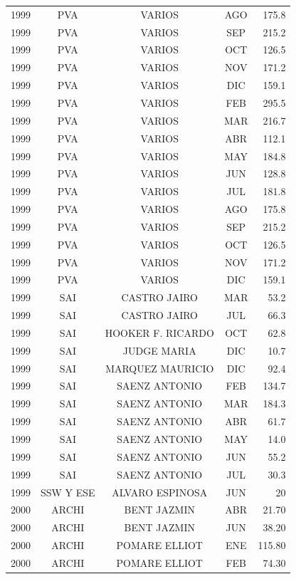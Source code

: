 \documentclass[12pt,]{article}
\begin{document}
\begin{table}[ht]
{\begin{tabular}{lcccr}
  1999 & PVA & VARIOS & AGO & 175.8 \\ 
  1999 & PVA & VARIOS & SEP & 215.2 \\ 
  1999 & PVA & VARIOS & OCT & 126.5 \\ 
  1999 & PVA & VARIOS & NOV & 171.2 \\ 
  1999 & PVA & VARIOS & DIC & 159.1 \\ 
  1999 & PVA & VARIOS & FEB & 295.5 \\ 
  1999 & PVA & VARIOS & MAR & 216.7 \\ 
  1999 & PVA & VARIOS & ABR & 112.1 \\ 
  1999 & PVA & VARIOS & MAY & 184.8 \\ 
  1999 & PVA & VARIOS & JUN & 128.8 \\ 
  1999 & PVA & VARIOS & JUL & 181.8 \\ 
  1999 & PVA & VARIOS & AGO & 175.8 \\ 
  1999 & PVA & VARIOS & SEP & 215.2 \\ 
  1999 & PVA & VARIOS & OCT & 126.5 \\ 
  1999 & PVA & VARIOS & NOV & 171.2 \\ 
  1999 & PVA & VARIOS & DIC & 159.1 \\ 
  1999 & SAI & CASTRO JAIRO & MAR & 53.2 \\ 
  1999 & SAI & CASTRO JAIRO & JUL & 66.3 \\ 
  1999 & SAI & HOOKER F. RICARDO & OCT & 62.8 \\ 
  1999 & SAI & JUDGE MARIA & DIC & 10.7 \\ 
  1999 & SAI & MARQUEZ MAURICIO & DIC & 92.4 \\ 
  1999 & SAI & SAENZ ANTONIO & FEB & 134.7 \\ 
  1999 & SAI & SAENZ ANTONIO & MAR & 184.3 \\ 
  1999 & SAI & SAENZ ANTONIO & ABR & 61.7 \\ 
  1999 & SAI & SAENZ ANTONIO & MAY & 14.0 \\ 
  1999 & SAI & SAENZ ANTONIO & JUN & 55.2 \\ 
  1999 & SAI & SAENZ ANTONIO & JUL & 30.3 \\ 
  1999 & SSW Y ESE & ALVARO ESPINOSA & JUN & 20 \\ 
  2000 & ARCHI & BENT JAZMIN & ABR & 21.70 \\ 
  2000 & ARCHI & BENT JAZMIN & JUN & 38.20 \\ 
  2000 & ARCHI & POMARE ELLIOT & ENE & 115.80 \\ 
  2000 & ARCHI & POMARE ELLIOT & FEB & 74.30 \\ 

\end{tabular}}
\end{table}
\end{document}

